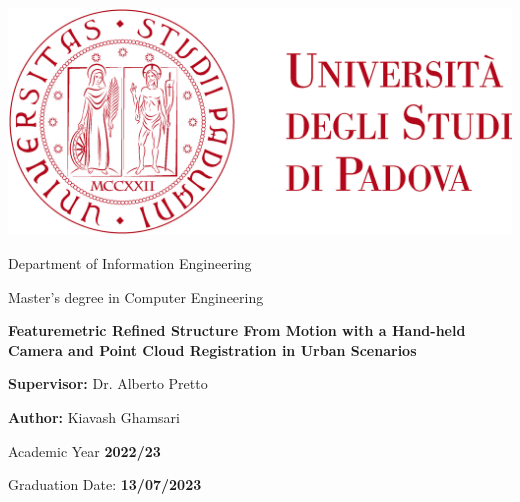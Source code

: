 \documentclass{article}
\date{\today}
\begin{document}
\begin{titlepage}
  \centering

  \includegraphics[width=1\textwidth]{images/unipd}

  \vspace{1cm}

  \LARGE Department of Information Engineering

  Master's degree in Computer Engineering

  \vspace{1cm}

  \LARGE\textbf{Featuremetric Refined Structure From Motion with a Hand-held Camera and Point Cloud Registration in Urban Scenarios}

  \vspace{1cm}

  \Large\textbf{Supervisor:} Dr. Alberto Pretto

  \textbf{Author:} Kiavash Ghamsari

  \vfill

  \vspace{1cm}
  Academic Year \Large\textbf{2022/23}


  Graduation Date: \Large\textbf{13/07/2023}
\end{titlepage}
\end{document}
